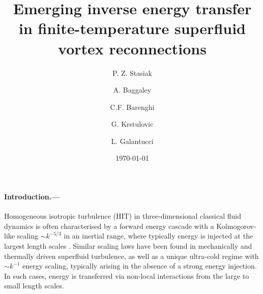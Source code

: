 \documentclass[%
 reprint,
 amsmath,amssymb,
 aps,
 prl,
]{revtex4-2}
\begin{document}

\title{Emerging inverse energy transfer in finite-temperature superfluid vortex reconnections}

\author{P. Z. Stasiak}
\author{A. Baggaley}
\author{C.F. Barenghi}

\author{G. Krstulovic}

\author{L. Galantucci}

\date{\today}%

\begin{abstract}
\blindtext
\end{abstract}

\maketitle

\paragraph*{Introduction.---} Homogeneous isotropic turbulence (HIT) in three-dimensional classical fluid dynamics is often characterised by a forward energy cascade with a Kolmogorov-like scaling $\sim k^{-5/3}$ in an inertial range, where typically energy is injected at the largest length scales \cite{frisch1995}. Similar scaling laws have been found in mechanically \cite{maurer1998,baggaley2012} and thermally \cite{sherwin-robson2015} driven superfluid turbulence, as well as a unique ultra-cold regime with $\sim k^{-1}$ energy scaling, typically arising in the absence of a strong energy injection. In such cases, energy is transferred via non-local interactions from the large to small length scales.
\end{document}
